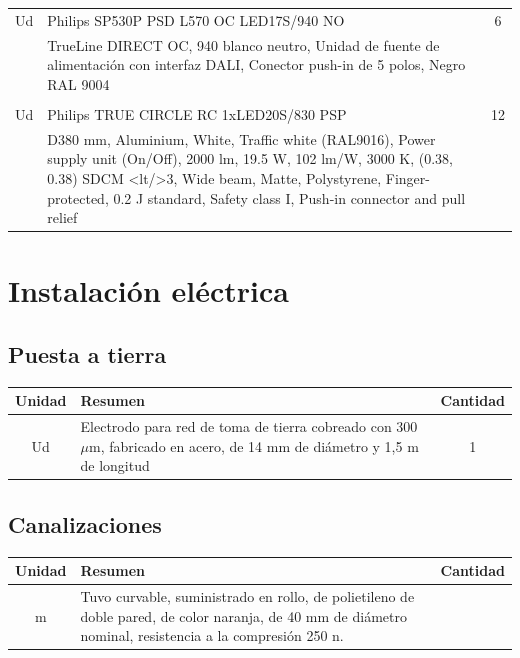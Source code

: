 \documentclass[../main.tex]{subfiles}
\begin{document}
\begin{table}[H]
\begin{tabular}{c p{11.5cm} c}
        \\
        Ud & Philips SP530P PSD L570 OC LED17S/940 NO & 6 \\
        & TrueLine DIRECT OC, 940 blanco neutro, Unidad de fuente de alimentación con interfaz DALI, Conector push-in de 5 polos, Negro RAL 9004 &\\
        \\
        Ud & Philips TRUE CIRCLE RC 1xLED20S/830 PSP & 12 \\
        & D380 mm, Aluminium, White, Traffic white (RAL9016), Power supply unit (On/Off), 2000 lm, 19.5 W, 102 lm/W, 3000 K, (0.38, 0.38) SDCM <lt/>3, Wide beam, Matte, Polystyrene, Finger-protected, 0.2 J standard, Safety class I, Push-in connector and pull relief & 
    \end{tabular}
\end{table}

\section{Instalación eléctrica}
\subsection{Puesta a tierra}
\begin{table}[H]
    \centering
    \begin{tabular}{c p{11.5cm} c}
        Unidad & Resumen & Cantidad  \\ \hline
        Ud & Electrodo para red de toma de tierra cobreado con 300 $\mu$m, fabricado en acero, de 14 mm de diámetro y 1,5 m de longitud & 1
    \end{tabular}
\end{table}

\subsection{Canalizaciones}
\begin{table}[H]
    \centering
    \begin{tabular}{c p{11.5cm} c}
        Unidad & Resumen & Cantidad  \\ \hline
        m &  Tuvo curvable, suministrado en rollo, de polietileno de doble pared, de color naranja, de 40 mm de diámetro nominal, resistencia a la compresión 250 n. \\
    \end{tabular}
\end{table}
\end{document}
